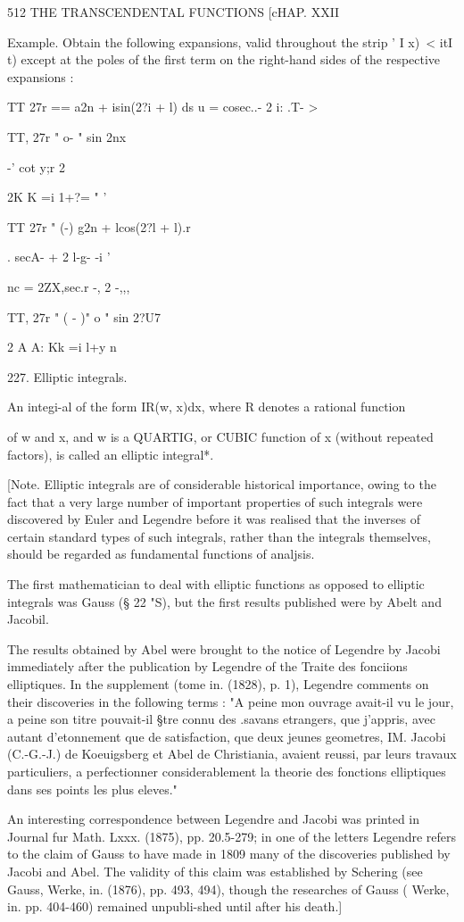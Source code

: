 512 THE TRANSCENDENTAL FUNCTIONS [cHAP. XXII

Example. Obtain the following expansions, valid throughout the strip '
I x)\ < itI t) except at the poles of the first term on the right-hand
sides of the respective expansions :

TT 27r == a2n + isin(2?i + l) ds u = cosec..- 2 i: .T- >

TT, 27r " o- " sin 2nx

-' cot y;r 2

2K K =i 1+?= " '

TT 27r " (-) g2n + lcos(2?l + l).r

 . secA- + 2 l-g- -i '

nc = 2ZX,sec.r -, 2 -,,,

TT, 27r " ( - )" o " sin 2?U7

2 A A: Kk =i l+y n

227. Elliptic integrals.

An integi-al of the form IR(w, x)dx, where R denotes a rational
function

of w and x, and w is a QUARTIG, or CUBIC function of x (without
repeated factors), is called an elliptic integral*.

[Note. Elliptic integrals are of considerable historical importance,
owing to the fact that a very large number of important properties of
such integrals were discovered by Euler and Legendre before it was
realised that the inverses of certain standard types of such
integrals, rather than the integrals themselves, should be regarded as
fundamental functions of analjsis.

The first mathematician to deal with elliptic functions as opposed to
elliptic integrals was Gauss (§ 22 "S), but the first results
published were by Abelt and Jacobil.

The results obtained by Abel were brought to the notice of Legendre by
Jacobi immediately after the publication by Legendre of the Traite des
fonciions elliptiques. In the supplement (tome in. (1828), p. 1),
Legendre comments on their discoveries in the following terms : "A
peine mon ouvrage avait-il vu le jour, a peine son titre pouvait-il
§tre connu des .savans etrangers, que j'appris, avec autant
d'etonnement que de satisfaction, que deux jeunes geometres, IM.
Jacobi (C.-G.-J.) de Koeuigsberg et Abel de Christiania, avaient
reussi, par leurs travaux particuliers, a perfectionner
considerablement la theorie des fonctions elliptiques dans ses points
les plus eleves."

An interesting correspondence between Legendre and Jacobi was printed
in Journal fur Math. Lxxx. (1875), pp. 20.5-279; in one of the letters
Legendre refers to the claim of Gauss to have made in 1809 many of the
discoveries published by Jacobi and Abel. The validity of this claim
was established by Schering (see Gauss, Werke, in. (1876), pp. 493,
494), though the researches of Gauss ( Werke, in. pp. 404-460)
remained unpubli-shed until after his death.]


